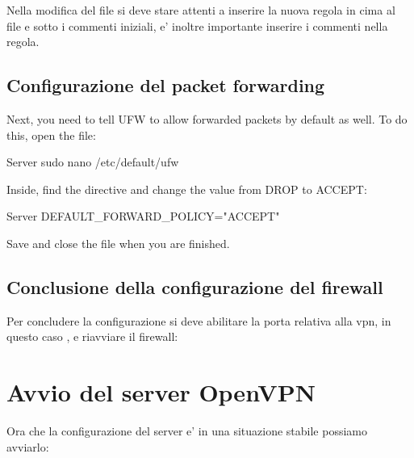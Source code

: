 Nella modifica del file si deve stare attenti a inserire la nuova regola in cima al file e sotto i commenti iniziali, e' inoltre importante inserire i commenti nella regola.

\subsection{Configurazione del packet forwarding}

Next, you need to tell UFW to allow forwarded packets by default as well. To do this, open the  file:

\begin{bashcode}{Server}{}
sudo nano /etc/default/ufw
\end{bashcode}

Inside, find the  directive and change the value from DROP to ACCEPT:

\begin{bashcode}{Server}{}
DEFAULT_FORWARD_POLICY="ACCEPT"
\end{bashcode}

Save and close the file when you are finished.

\subsection{Conclusione della configurazione del firewall}

Per concludere la configurazione si deve abilitare la porta relativa alla vpn, in questo caso , e riavviare il firewall:



\section{Avvio del server OpenVPN}
\label{sec:start_server}

Ora che la configurazione del server e' in una situazione stabile possiamo avviarlo:

